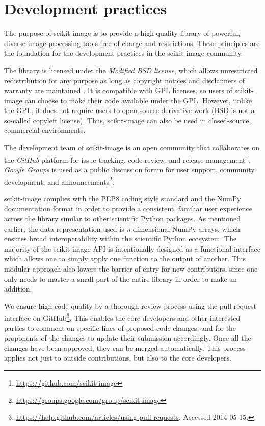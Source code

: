 
\section*{Development practices}
  \label{sec:development-practices}

  The purpose of scikit-image is to provide a high-quality library of powerful, diverse image processing tools free of charge and restrictions. These principles are the foundation for the development practices in the scikit-image community.

  The library is licensed under the \emph{Modified BSD license}, which allows unrestricted redistribution for any purpose as long as copyright notices and disclaimers of warranty are maintained \citep{BSD}. It is compatible with GPL licenses, so users of scikit-image can choose to make their code available under the GPL. However, unlike the GPL, it does not require users to open-source derivative work (BSD is not a so-called copyleft license). Thus, scikit-image can also be used in closed-source, commercial environments.

  The development team of scikit-image is an open community that collaborates on the \emph{GitHub} platform for issue tracking, code review, and release management\footnote{\url{https://github.com/scikit-image}}. \emph{Google Groups} is used as a public discussion forum for user support, community development, and announcements\footnote{\url{https://groups.google.com/group/scikit-image}}.

  scikit-image complies with the PEP8 coding style standard \citep{PEP8} and the NumPy documentation format \citep{NumpyDoc} in order to provide a consistent, familiar user experience across the library similar to other scientific Python packages. As mentioned earlier, the data representation used is \emph{n}-dimensional NumPy arrays, which ensures broad interoperability within the scientific Python ecosystem. The majority of the scikit-image API is intentionally designed as a functional interface which allows one to simply apply one function to the output of another. This modular approach also lowers the barrier of entry for new contributors, since one only needs to master a small part of the entire library in order to make an addition.

  We ensure high code quality by a thorough review process using the pull
  request interface on GitHub\footnote{\url{https://help.github.com/articles/using-pull-requests}, Accessed 2014-05-15.}.
  This enables the core developers and other interested parties to comment on
  specific lines of proposed code changes, and for the proponents of the
  changes to update their submission accordingly. Once all the changes have
  been approved, they can be merged automatically. This process applies not
  just to outside contributions, but also to the core developers.

